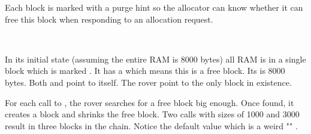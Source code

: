 Each block is marked with a purge hint so the allocator can know whether it can free this block when responding to an allocation request.\\
\par
{}\\
\par
In its initial state (assuming the entire RAM is 8000 bytes) all RAM is in a single block which is marked . It has a   which means this is a free block. Its  is 8000 bytes. Both  and  point to itself. The rover point to the only block in existence.\\
\par
{}
\par
For each call to , the rover searches for a free block big enough. Once found, it creates a block and shrinks the free block. Two calls with sizes of 1000 and 3000 result in three blocks in the chain. Notice the default  value which is a weird "" .\\
\par
{}

